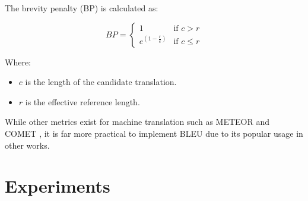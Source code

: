 \documentclass[a4paper]{article}
\begin{document}
The brevity penalty (BP) is calculated as:

\begin{equation}
    BP = \begin{cases}
        1                     & \text{if } c > r    \\
        e^{(1 - \frac{r}{c})} & \text{if } c \leq r
    \end{cases}
\end{equation}

Where:
\begin{itemize}
    \item \( c \) is the length of the candidate translation.
    \item \( r \) is the effective reference length.
\end{itemize}

While other metrics exist for machine translation such as METEOR \cite{lavie-2007-meteor} and COMET \cite{rei-2020-comet}, it is far more practical to implement BLEU due to its popular usage in other works.










\section{Experiments}
\end{document}

